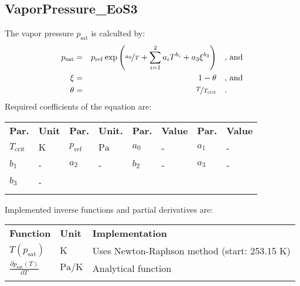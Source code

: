 \subsection{VaporPressure\_EoS3}
\label{cha:approaches:refp:eos3}
%
The vapor pressure $p_\mathrm{sat}$ is calculted by:
%
\begin{equation*}
	\begin{split}
		p_\mathrm{sat} &=& p_\mathrm{ref} \exp \left( \nicefrac{a_0}{T} + \sum_{i=1}^{2} a_i T^{b_i} + a_3 \xi^{b_3} \right) & \quad\text{, and} \\
		\xi &=& 1 - \theta & \quad\text{, and} \\
		\theta &=& \nicefrac{T}{T_\mathrm{crit}} & \quad\text{.}
	\end{split}
\end{equation*}
%
Required coefficients of the equation are:
%
\begin{longtable}[l]{ll|ll|ll|ll}
\toprule
\addlinespace
\textbf{Par.} & \textbf{Unit} & \textbf{Par.} &	\textbf{Unit.} & \textbf{Par.} & \textbf{Value} & \textbf{Par.} & \textbf{Value} \\
\addlinespace
\midrule
\endhead

\bottomrule
\endfoot
\bottomrule
\endlastfoot
\addlinespace

$T_\mathrm{crit}$ & $\si{\kelvin}$ & $p_\mathrm{ref}$ & $\si{\pascal}$ &$a_0$ & - & $a_1$ & - \\	
$b_1$ & - &	$a_2$ & - &	$b_2$ & - &	$a_3$ & - \\	
$b_3$ & - &	& &	& & & \\


\addlinespace
\end{longtable}
%
Implemented inverse functions and partial derivatives are:
%
\begin{longtable}[l]{l|l|l}
	\toprule
	\addlinespace
	\textbf{Function} & \textbf{Unit} &	\textbf{Implementation} \\
	\addlinespace
	\midrule
	\endhead
	
	\bottomrule
	\endfoot
	\bottomrule
	\endlastfoot
	\addlinespace
	
	$T(p_\mathrm{sat})$	& $\si{\kelvin}$ & Uses Newton-Raphson method (start: 253.15 K) \\
	$\frac{\partial p_\mathrm{sat}(T)}{\partial T}$	& $\si{\pascal\per\kelvin}$ & Analytical function\\
	
	\addlinespace
\end{longtable}
%
